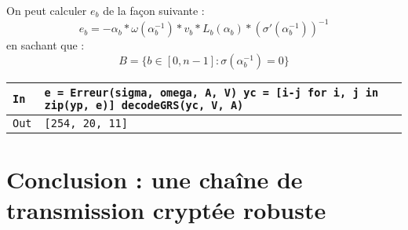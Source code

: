 \documentclass[titlepage]{article}
\begin{document}
        On peut calculer $e_b$ de la façon suivante : 
        \[e_b = -\alpha_b*\omega(\alpha_b^{-1})*v_b*L_b(\alpha_b)*(\sigma'(\alpha_b^{-1}))^{-1}\]
        en sachant que : 
        \[B = \{b \in [0,n-1] : \sigma(\alpha_b^{-1}) = 0 \}\]

        

        \begin{tabularx}{12cm}{|p{0.60cm}|X|}
            \hline
            \rowcolor{gray}
            \texttt{In}
            & 
            \texttt{e = Erreur(sigma, omega, A, V)\newline
            yc = [i-j for i, j in zip(yp, e)]\newline
            decodeGRS(yc, V, A)}
            \\
            \hline
            \texttt{Out}
            &
            \texttt{[254, 20, 11]}
            \\
            \hline
        \end{tabularx}
        \bigbreak

    \section{Conclusion : une chaîne de transmission cryptée robuste}
\end{document}
